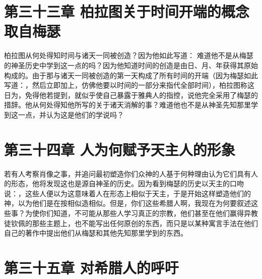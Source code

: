 \section{第三十三章 柏拉图关于时间开端的概念取自梅瑟}

柏拉图从何处得知时间与诸天一同被创造？因为他如此写道： 难道他不是从梅瑟的神圣历史中学到这一点的吗？因为他知道时间的创造是由日、月、年获得其原始构成的。由于那与诸天一同被创造的第一天构成了所有时间的开端（因为梅瑟如此写道：，然后立即加上，仿佛他要以时间的一部分来指代全部时间），柏拉图称这日为，免得他若提到，就似乎使自己暴露于雅典人的指控，说他完全采用了梅瑟的措辞。他从何处得知他所写的关于诸天消解的事？难道他也不是从神圣先知那里学到这一点，并认为这是他们的学说吗？\par


\section{第三十四章 人为何赋予天主人的形象}

若有人考察肖像之事，并追问最初塑造你们众神的人基于何种理由认为它们具有人的形态，他将发现这也是源自神圣的历史。因为看到梅瑟的历史以天主的口吻说：，这些人便以为这意味着人在形态上相似于天主，于是开始这样塑造他们的神，以为他们是在按相似造相似。但是，你们这些希腊人啊，我现在为何要叙述这些事？为使你们知道，不可能从那些人学习真正的宗教，他们甚至在他们赢得异教徒钦佩的那些主题上，也不能写出任何原创的东西，而只是以某种寓言手法在他们自己的著作中提出他们从梅瑟和其他先知那里学到的东西。\par


\section{第三十五章 对希腊人的呼吁}

